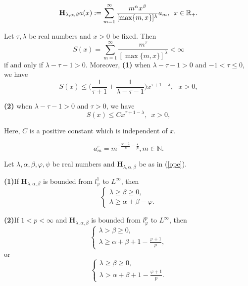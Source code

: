 \documentclass[10pt,a4paper]{amsart}
\begin{document}
\begin{equation}\label{ope}{\bf H}_{\lambda, \alpha, \beta}a(x):=\sum_{m=1}^{\infty}\frac{m^{\alpha}x^{\beta}}{[\max\{m, x\}]^{\lambda}}a_m,\,\,\,  x\in \mathbb{R}_{+}.\end{equation}

\begin{lemma}\label{ll-5}Let $\tau, \lambda$ be real numbers and $x>0$ be fixed. Then 
 $$S(x)=\sum_{m=1}^{\infty}\frac{m^{\tau}}{[\max\{m,x\}]^{\lambda}}<\infty$$
 if and only if $\lambda-\tau-1>0$. Moreover, {\bf (1)} when $\lambda-\tau-1>0$ and $-1<\tau\leq 0$, we have
$$S(x)\leq \Big(\frac{1}{\tau+1}+\frac{1}{\lambda-\tau-1}\Big)x^{\tau+1-\lambda},\,\,\,\, x>0,$$

{\bf (2)}
when $\lambda-\tau-1>0$ and $\tau>0$, we have
$$S(x)\leq C x^{\tau+1-\lambda},\,\,\, x>0,$$


Here, $C$ is a positive constant which is independent of $x$. 
\end{lemma}

\begin{equation}\label{ff-2}a_m^{\varepsilon}=m^{-\frac{\varphi+1}{p}-\frac{\varepsilon}{p}}, m\in \mathbb{N}. 
\end{equation}

\begin{lemma}\label{ll-5-add}
Let $\lambda, \alpha, \beta, \varphi, \psi$ be real numbers and $\mathbf{H}_{\lambda, \alpha, \beta}$ be as in (\ref{ope}). 

{\bf (1)}If $\mathbf{H}_{\lambda, \alpha, \beta}$ is bounded from 
$l_{\varphi}^1$ to $L^{\infty}$, then  
\begin{equation} 
\begin{cases}
\lambda\geq \beta\geq 0, \\
\lambda\geq \alpha+\beta-\varphi. \nonumber 
\end{cases}
\end{equation}

{\bf (2)}If $1<p<\infty$ and $\mathbf{H}_{\lambda, \alpha, \beta}$ is bounded from 
$l_{\varphi}^p$ to $L^{\infty}$, then  
\begin{equation}\label{ad-eq-1}
\begin{cases}
\lambda>\beta\geq0, \\
\lambda\geq\alpha+\beta+1-\frac{\varphi+1}{p}, 
\end{cases}
\end{equation}
or
\begin{equation}\label{ad-eq-2}
\begin{cases}
\lambda\geq \beta\geq0, \\
\lambda>\alpha+\beta+1-\frac{\varphi+1}{p}. 
\end{cases}
\end{equation}
\end{lemma}
\end{document}
